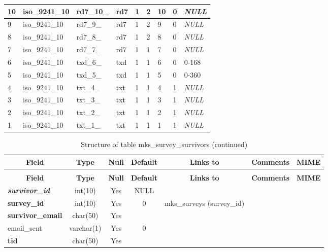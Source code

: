 \begin{longtable}{|l|l|l|l|l|l|l|l|l|}
10 & iso\_9241\_10 & rd7\_10\_ & rd7 & 1 & 2 & 10 & 0 & \textit{NULL} \\ \hline 
9 & iso\_9241\_10 & rd7\_9\_ & rd7 & 1 & 2 & 9 & 0 & \textit{NULL} \\ \hline 
8 & iso\_9241\_10 & rd7\_8\_ & rd7 & 1 & 2 & 8 & 0 & \textit{NULL} \\ \hline 
7 & iso\_9241\_10 & rd7\_7\_ & rd7 & 1 & 1 & 7 & 0 & \textit{NULL} \\ \hline 
6 & iso\_9241\_10 & txd\_6\_ & txd & 1 & 1 & 6 & 0 & 0-168 \\ \hline 
5 & iso\_9241\_10 & txd\_5\_ & txd & 1 & 1 & 5 & 0 & 0-360 \\ \hline 
4 & iso\_9241\_10 & txt\_4\_ & txt & 1 & 1 & 4 & 1 & \textit{NULL} \\ \hline 
3 & iso\_9241\_10 & txt\_3\_ & txt & 1 & 1 & 3 & 1 & \textit{NULL} \\ \hline 
2 & iso\_9241\_10 & txt\_2\_ & txt & 1 & 1 & 2 & 1 & \textit{NULL} \\ \hline 
1 & iso\_9241\_10 & txt\_1\_ & txt & 1 & 1 & 1 & 1 & \textit{NULL} \\ \hline 
 \end{longtable}

%
%
 \begin{longtable}{|l|c|c|c|l|l|l|} 
 \caption{Structure of table mks\_survey\_survivors} \label{tab:mks_survey_survivors-structure} \\
 \hline \multicolumn{1}{|c|}{\textbf{Field}} & \multicolumn{1}{|c|}{\textbf{Type}} & \multicolumn{1}{|c|}{\textbf{Null}} & \multicolumn{1}{|c|}{\textbf{Default}} & \multicolumn{1}{|c|}{\textbf{Links to}} & \multicolumn{1}{|c|}{\textbf{Comments}} & \multicolumn{1}{|c|}{\textbf{MIME}} \\ \hline \hline
\endfirsthead
 \caption{Structure of table mks\_survey\_survivors (continued)} \\ 
 \hline \multicolumn{1}{|c|}{\textbf{Field}} & \multicolumn{1}{|c|}{\textbf{Type}} & \multicolumn{1}{|c|}{\textbf{Null}} & \multicolumn{1}{|c|}{\textbf{Default}} & \multicolumn{1}{|c|}{\textbf{Links to}} & \multicolumn{1}{|c|}{\textbf{Comments}} & \multicolumn{1}{|c|}{\textbf{MIME}} \\ \hline \hline \endhead \endfoot 
\textbf{\textit{survivor\_id}} & int(10) & Yes & NULL &  &  &  \\ \hline 
\textbf{survey\_id} & int(10) & Yes & 0 & mks\_surveys (survey\_id) &  &  \\ \hline 
\textbf{survivor\_email} & char(50) & Yes &  &  &  &  \\ \hline 
email\_sent & varchar(1) & Yes & 0 &  &  &  \\ \hline 
\textbf{tid} & char(50) & Yes &  &  &  &  \\ \hline 
 \end{longtable}


